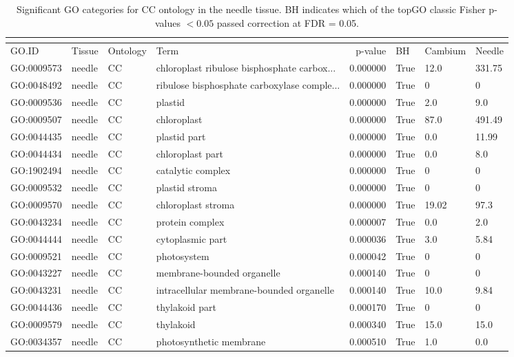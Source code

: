 \begin{longtable}{llllrl}
\caption{Significant GO categories for CC ontology in the needle tissue. BH indicates which of the topGO classic Fisher p-values $< 0.05$ passed correction at FDR = 0.05.}\\
\label{tab:go-needle-CC}\\
\toprule
GO.ID & Tissue & Ontology & Term & p-value & BH & Cambium & Needle \\
\midrule
GO:0009573 & needle & CC &   chloroplast ribulose bisphosphate carbox...  & 0.000000 &   True  & 12.0 & 331.75 \\ 
GO:0048492 & needle & CC &   ribulose bisphosphate carboxylase comple...  & 0.000000 &   True  & 0 & 0 \\
GO:0009536 & needle & CC &   plastid  & 0.000000 &   True  & 2.0 & 9.0 \\ 
GO:0009507 & needle & CC &   chloroplast  & 0.000000 &   True  & 87.0 & 491.49 \\ 
GO:0044435 & needle & CC &   plastid part  & 0.000000 &   True  & 0.0 & 11.99 \\ 
GO:0044434 & needle & CC &   chloroplast part  & 0.000000 &   True  & 0.0 & 8.0 \\ 
GO:1902494 & needle & CC &   catalytic complex  & 0.000000 &   True  & 0 & 0 \\
GO:0009532 & needle & CC &   plastid stroma  & 0.000000 &   True  & 0 & 0 \\
GO:0009570 & needle & CC &   chloroplast stroma  & 0.000000 &   True  & 19.02 & 97.3 \\ 
GO:0043234 & needle & CC &   protein complex  & 0.000007 &   True  & 0.0 & 2.0 \\ 
GO:0044444 & needle & CC &   cytoplasmic part  & 0.000036 &   True  & 3.0 & 5.84 \\ 
GO:0009521 & needle & CC &   photosystem  & 0.000042 &   True  & 0 & 0 \\
GO:0043227 & needle & CC &   membrane-bounded organelle  & 0.000140 &   True  & 0 & 0 \\
GO:0043231 & needle & CC &   intracellular membrane-bounded organelle  & 0.000140 &   True  & 10.0 & 9.84 \\ 
GO:0044436 & needle & CC &   thylakoid part  & 0.000170 &   True  & 0 & 0 \\
GO:0009579 & needle & CC &   thylakoid  & 0.000340 &   True  & 15.0 & 15.0 \\ 
GO:0034357 & needle & CC &   photosynthetic membrane  & 0.000510 &   True  & 1.0 & 0.0 \\ 

\end{longtable}

